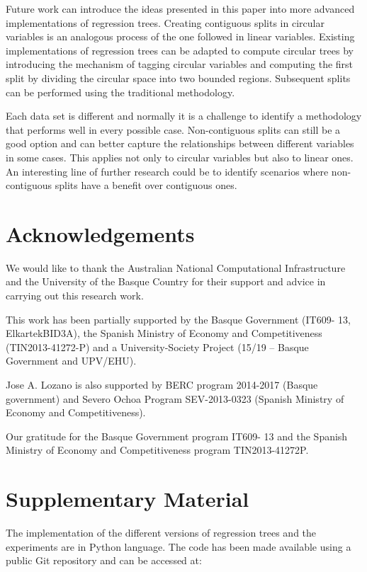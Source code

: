 \documentclass[times,twocolumn,final,authoryear]{elsarticle}
\begin{document}
Future work can introduce the ideas presented in this paper into more advanced implementations of regression trees. Creating contiguous splits in circular variables is an analogous process of the one followed in linear variables. Existing implementations of regression trees can be adapted to compute circular trees by introducing the mechanism of tagging circular variables and computing the first split by dividing the circular space into two bounded regions. Subsequent splits can be performed using the traditional methodology.

Each data set is different and normally it is a challenge to identify a methodology that performs well in every possible case. Non-contiguous splits can still be a good option and can better capture the relationships between different variables in some cases. This applies not only to circular variables but also to linear ones. An interesting line of further research could be to identify scenarios where non-contiguous splits have a benefit over contiguous ones.


\section*{Acknowledgements}

We would like to thank the Australian National Computational Infrastructure and the University of the Basque Country for their support and advice in carrying out this research work.

This work has been partially supported by the Basque Government (IT609-
13, ElkartekBID3A), the Spanish Ministry of Economy and Competitiveness (TIN2013-41272-P) and a University-Society Project (15/19 – Basque Government and UPV/EHU). 

Jose A. Lozano is also supported by BERC program 2014-2017 (Basque government) and Severo Ochoa Program SEV-2013-0323 (Spanish Ministry of Economy and Competitiveness).

Our gratitude for the Basque Government program IT609- 13 and the Spanish Ministry of Economy and Competitiveness program TIN2013-41272P.






\section*{Supplementary Material}

The implementation of the different versions of regression trees and the experiments are in Python language. The code has been made available using a public Git repository and can be accessed at:
\end{document}
